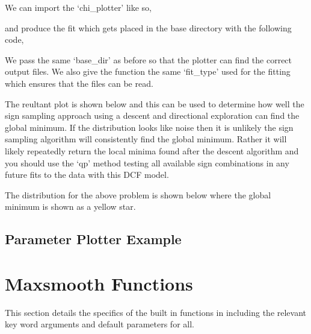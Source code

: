\documentclass[letterpaper,10pt,english]{sphinxmanual}
\let\sphinxpxdimen\pdfpxdimen\else\newdimen\sphinxpxdimen
\begin{document}
We can import the ‘chi\_plotter’ like so,

\begin{sphinxVerbatim}[commandchars=\\\{\}]
   
\end{sphinxVerbatim}

and produce the fit which gets placed in the base directory with the following
code,

\begin{sphinxVerbatim}[commandchars=\\\{\}]
  
\end{sphinxVerbatim}

We pass the same ‘base\_dir’ as before so that the plotter can find the correct output
files. We also give the function the same ‘fit\_type’ used for the fitting which
ensures that the files can be read.

The reultant plot is shown below and this can be used to determine how well
the sign sampling approach using a descent and directional exploration
can find the global minimum. If the distribution looks like noise then it is
unlikely the sign sampling algorithm will consistently find the global minimum.
Rather it will likely repeatedly return the local minima found after the descent
algorithm and you should use the ‘qp’ method testing all available sign combinations
in any future fits to the data with this DCF model.

The distribution for the above problem is shown below where the global minimum
is shown as a yellow star.

\noindent{\hspace*{\fill}\sphinxincludegraphics[width=400\sphinxpxdimen]{{chi_distribution}.png}\hspace*{\fill}}


\section{Parameter Plotter Example}
\label{\detokenize{source/maxsmooth:parameter-plotter-example}}

\chapter{Maxsmooth Functions}
\label{\detokenize{source/maxsmooth:maxsmooth-functions}}
This section details the specifics of the built in functions in  including
the relevant key word arguments and default parameters for all.
\end{document}
